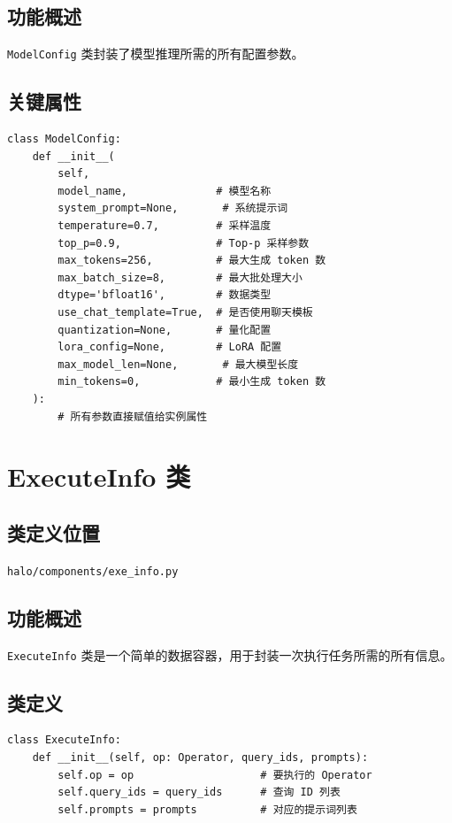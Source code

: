 \documentclass[12pt,a4paper]{article}
\begin{document}
\subsection{功能概述}
\texttt{ModelConfig} 类封装了模型推理所需的所有配置参数。

\subsection{关键属性}

\begin{lstlisting}
class ModelConfig:
    def __init__(
        self, 
        model_name,              # 模型名称
        system_prompt=None,       # 系统提示词
        temperature=0.7,         # 采样温度
        top_p=0.9,               # Top-p 采样参数
        max_tokens=256,          # 最大生成 token 数
        max_batch_size=8,        # 最大批处理大小
        dtype='bfloat16',        # 数据类型
        use_chat_template=True,  # 是否使用聊天模板
        quantization=None,       # 量化配置
        lora_config=None,        # LoRA 配置
        max_model_len=None,       # 最大模型长度
        min_tokens=0,            # 最小生成 token 数
    ):
        # 所有参数直接赋值给实例属性
\end{lstlisting}

\section{ExecuteInfo 类}

\subsection{类定义位置}
\texttt{halo/components/exe\_info.py}

\subsection{功能概述}
\texttt{ExecuteInfo} 类是一个简单的数据容器，用于封装一次执行任务所需的所有信息。

\subsection{类定义}

\begin{lstlisting}
class ExecuteInfo:
    def __init__(self, op: Operator, query_ids, prompts):
        self.op = op                    # 要执行的 Operator
        self.query_ids = query_ids      # 查询 ID 列表
        self.prompts = prompts          # 对应的提示词列表
\end{lstlisting}
\end{document}
